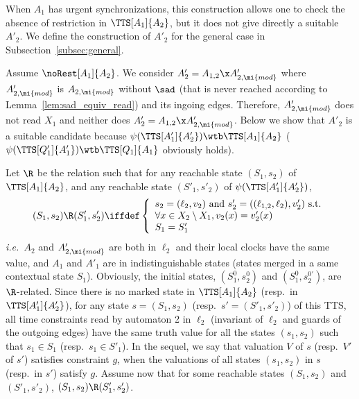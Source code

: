 \documentclass{LMCS}
\theoremstyle{plain}\newtheorem*{prop11}{Proposition~\ref{prop:states} bis}
\def\ie{{\em i.e.\ }}
\begin{document}
When $A_1$ has urgent synchronizations, this construction allows one to check
the absence of restriction in $\TTS[A_1]{A_2}$, but it does not give directly
a suitable $A'_2$. We define the construction of $A'_2$ for
the general case in Subsection~\ref{subsec:general}.



\label{proof}\hfill


  \noindent Assume $\noRest[A_1]{A_2}$.
  We consider
  $A'_2=A_{1,2}\x A'_{2,\mi{mod}}$ where $A'_{2,\mi{mod}}$ is
  $A_{2,\mi{mod}}$ without $\sad$ (that is never reached according to
  Lemma~\ref{lem:sad_equiv_read}) and its ingoing edges. Therefore,
  $A'_{2,\mi{mod}}$ does not read $X_1$ and neither does
  $A'_2=A_{1,2}\x A'_{2,\mi{mod}}$. Below we show that $A'_2$ is a suitable
  candidate because $\psi(\TTS[A'_1]{A'_2})\wtb\TTS[A_1]{A_2}$
  ($\psi(\TTS[Q'_1]{A'_1})\wtb\TTS[Q_1]{A_1}$ obviously holds).

  Let $\R$ be the relation such that for any reachable state $(S_1,s_2)$ of
  $\TTS[A_1]{A_2}$, and any reachable state $(S'_1,s'_2)$ of $\psi(\TTS[A'_1]{A'_2})$,
  \[(S_1,s_2)\R(S'_1,s'_2) \iffdef\left\{
  \begin{array}{l}
    s_2=(\ell_2, v_2)\text{ and }s'_2=((\ell_{1,2},\ell_2),v'_2)\text{ s.t.}\\
    \forall x\in X_2\setminus X_1, v_2(x)=v'_2(x)\\
    S_1=S'_1\\
  \end{array}
  \right.\]
  \ie $A_2$ and $A'_{2,\mi{mod}}$ are both in $\ell_2$ and their local
  clocks have the same value, and $A_1$ and $A'_1$ are in
  indistinguishable states (states merged in a same contextual state $S_1$).
Obviously, the initial states, $(S_1^0,s_2^0)$ and
  $(S_1^0,s_2^{0\prime})$, are $\R$-related.
Since there is no marked state in $\TTS[A_1]{A_2}$ (resp.\ in
  $\TTS[A'_1]{A'_2}$), for any state $s=(S_1,s_2)$ (resp.\
  $s'=(S'_1,s'_2)$) of this TTS, all time constraints read by automaton 2 in
  $\ell_2$ (invariant of $\ell_2$ and guards of the outgoing edges) have the
  same truth value for all the states $(s_1,s_2)$ such that $s_1\in S_1$
  (resp.\ $s_1\in S'_1$).
In the sequel, we say that valuation $V$ of $s$ (resp.\ $V'$ of $s'$) satisfies
  constraint $g$, when the valuations of all states $(s_1,s_2)$ in $s$
  (resp.\ in $s'$) satisfy $g$.
  Assume now that for some reachable states $(S_1,s_2)$ and $(S'_1,s'_2)$,
  $(S_1,s_2)\R(S'_1,s'_2)$.
\end{document}
